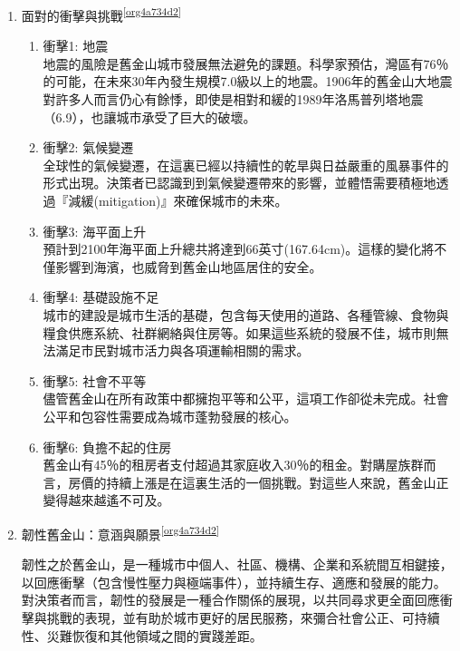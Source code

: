 \documentclass[a4paper,12pt]{article}
\begin{document}
\begin{enumerate}
\begin{enumerate}
\item 面對的衝擊與挑戰\textsuperscript{\ref{org4a734d2}}
\label{sec:org3605377}
\begin{enumerate}
\item 衝擊1: 地震\\
地震的風險是舊金山城市發展無法避免的課題。科學家預估，灣區有76％的可能，在未來30年內發生規模7.0級以上的地震。1906年的舊金山大地震對許多人而言仍心有餘悸，即使是相對和緩的1989年洛馬普列塔地震（6.9），也讓城市承受了巨大的破壞。\\
\item 衝擊2: 氣候變遷\\
全球性的氣候變遷，在這裏已經以持續性的乾旱與日益嚴重的風暴事件的形式出現。決策者已認識到到氣候變遷帶來的影響，並體悟需要積極地透過『減緩(mitigation)』來確保城市的未來。\\
\item 衝擊3: 海平面上升\\
預計到2100年海平面上升總共將達到66英寸(167.64cm)。這樣的變化將不僅影響到海濱，也威脅到舊金山地區居住的安全。\\
\item 衝擊4: 基礎設施不足\\
城市的建設是城市生活的基礎，包含每天使用的道路、各種管線、食物與糧食供應系統、社群網絡與住房等。如果這些系統的發展不佳，城市則無法滿足市民對城市活力與各項運輸相關的需求。\\
\item 衝擊5: 社會不平等\\
儘管舊金山在所有政策中都擁抱平等和公平，這項工作卻從未完成。社會公平和包容性需要成為城市蓬勃發展的核心。\\
\item 衝擊6: 負擔不起的住房\\
舊金山有45％的租房者支付超過其家庭收入30％的租金。對購屋族群而言，房價的持續上漲是在這裏生活的一個挑戰。對這些人來說，舊金山正變得越來越遙不可及。\\
\end{enumerate}

\item 韌性舊金山：意涵與願景\textsuperscript{\ref{org4a734d2}}
\label{sec:org453ac75}

韌性之於舊金山，是一種城市中個人、社區、機構、企業和系統間互相鍵接，以回應衝擊（包含慢性壓力與極端事件），並持續生存、適應和發展的能力。對決策者而言，韌性的發展是一種合作關係的展現，以共同尋求更全面回應衝擊與挑戰的表現，並有助於城市更好的居民服務，來彌合社會公正、可持續性、災難恢復和其他領域之間的實踐差距。\\


\end{enumerate}
\end{enumerate}
\end{document}
